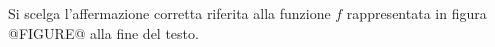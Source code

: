Si scelga l’affermazione corretta riferita alla funzione $f$ rappresentata in figura
@FIGURE@ alla fine del testo.
